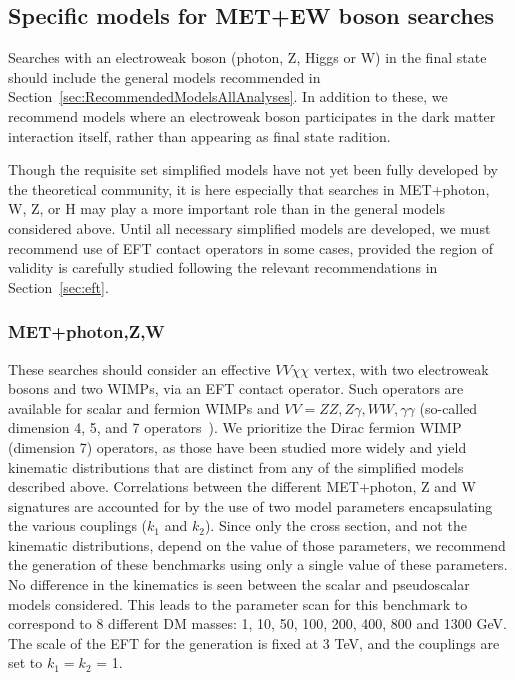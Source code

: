 \documentclass[a4,debug,notitlepage,nobib]{tufte-handout}
\begin{document}
\subsection{Specific models for MET+EW boson searches}

Searches with an electroweak boson (photon, Z, Higgs or W) in the
final state should include the general models recommended in
Section~\ref{sec:RecommendedModelsAllAnalyses}. In addition to these,
we recommend models where an electroweak boson participates in
the dark matter interaction itself, rather than appearing as final
state radition.

Though the requisite set simplified models have not yet been fully
developed by the theoretical community, it is here especially that
searches in MET+photon, W, Z, or H may play a more important role than
in the general models considered above. Until all necessary simplified models
are developed, we must recommend use of EFT contact operators
in some cases, provided the region of validity is carefully studied
following the relevant recommendations in Section~\ref{sec:eft}.


\subsubsection{MET+photon,Z,W} 

These searches should consider an
effective $VV\chi\chi$ vertex, with two electroweak bosons and two WIMPs,
via an EFT contact operator. Such operators are available for scalar
and fermion WIMPs and $VV=ZZ,Z \gamma,WW,\gamma \gamma$ (so-called
dimension 4, 5, and 7 operators~\cite{Carpenter:2012rg,
Crivellin:2015wva}). We prioritize the Dirac fermion WIMP (dimension
7) operators, as those have been studied more widely and yield
kinematic distributions that are distinct from any of the simplified
models described above.  Correlations between the different
MET+photon, Z and W signatures are accounted for by the use of two
model parameters encapsulating the various couplings ($k_1$ and $k_2$). 
Since only the cross section, and not the kinematic
distributions, depend on the value of those parameters, we recommend
the generation of these benchmarks using only a single value of these
parameters. No difference in the kinematics is seen between the scalar
and pseudoscalar models considered.  This leads to the parameter scan
for this benchmark to correspond to 8 different DM masses: 
1, 10, 50, 100, 200, 400, 800 and 1300 GeV. The scale of the EFT
for the generation is fixed at 3 TeV, and the couplings are
set to $k_1 = k_2$ = 1. 
\end{document}
